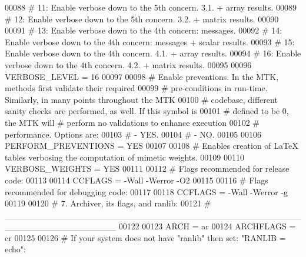 \begin{DoxyCode}
00088 \textcolor{stringliteral}{# 11: Enable verbose down to the 5th concern. 3.1. + array results.}
00089 \textcolor{stringliteral}{# 12: Enable verbose down to the 5th concern. 3.2. + matrix results.}
00090 \textcolor{stringliteral}{}
00091 \textcolor{stringliteral}{# 13: Enable verbose down to the 4th concern: messages.}
00092 \textcolor{stringliteral}{# 14: Enable verbose down to the 4th concern: messages + scalar results.}
00093 \textcolor{stringliteral}{# 15: Enable verbose down to the 4th concern. 4.1. + array results.}
00094 \textcolor{stringliteral}{# 16: Enable verbose down to the 4th concern. 4.2. + matrix results.}
00095 \textcolor{stringliteral}{}
00096 \textcolor{stringliteral}{VERBOSE\_LEVEL = 16}
00097 \textcolor{stringliteral}{}
00098 \textcolor{stringliteral}{# Enable preventions. In the MTK, methods first validate their required}
00099 \textcolor{stringliteral}{# pre-conditions in run-time. Similarly, in many points throughout the MTK}
00100 \textcolor{stringliteral}{# codebase, different sanity checks are performed, as well. If this symbol is}
00101 \textcolor{stringliteral}{# defined to be 0, the MTK will # perform no validations to enhance execution}
00102 \textcolor{stringliteral}{# performance. Options are:}
00103 \textcolor{stringliteral}{# - YES.}
00104 \textcolor{stringliteral}{# - NO.}
00105 \textcolor{stringliteral}{}
00106 \textcolor{stringliteral}{PERFORM\_PREVENTIONS = YES}
00107 \textcolor{stringliteral}{}
00108 \textcolor{stringliteral}{# Enables creation of LaTeX tables verbosing the computation of mimetic weights.}
00109 \textcolor{stringliteral}{}
00110 \textcolor{stringliteral}{VERBOSE\_WEIGHTS = YES}
00111 \textcolor{stringliteral}{}
00112 \textcolor{stringliteral}{# Flags recommended for release code:}
00113 \textcolor{stringliteral}{}
00114 \textcolor{stringliteral}{CCFLAGS = -Wall -Werror -O2}
00115 \textcolor{stringliteral}{}
00116 \textcolor{stringliteral}{# Flags recommended for debugging code:}
00117 \textcolor{stringliteral}{}
00118 \textcolor{stringliteral}{CCFLAGS = -Wall -Werror -g}
00119 \textcolor{stringliteral}{}
00120 \textcolor{stringliteral}{#   7. Archiver, its flags, and ranlib:}
00121 \textcolor{stringliteral}{#   \_\_\_\_\_\_\_\_\_\_\_\_\_\_\_\_\_\_\_\_\_\_\_\_\_\_\_\_\_\_\_\_\_\_\_\_\_\_\_\_\_\_\_\_\_\_\_\_\_\_\_\_\_\_\_\_\_\_\_\_\_\_\_\_\_\_}
00122 \textcolor{stringliteral}{}
00123 \textcolor{stringliteral}{ARCH      = ar}
00124 \textcolor{stringliteral}{ARCHFLAGS = cr}
00125 \textcolor{stringliteral}{}
00126 \textcolor{stringliteral}{# If your system does not have "ranlib" then set: "RANLIB = echo":}

\end{DoxyCode}
